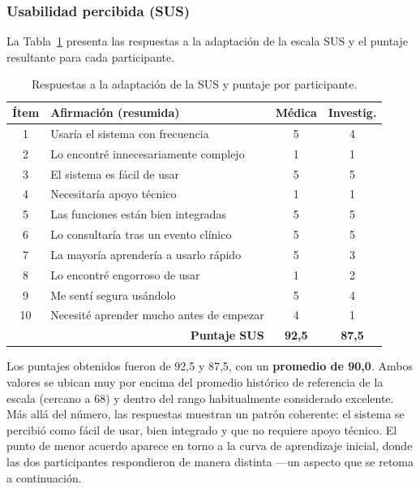 \documentclass[12pt,a4paper]{article}
\begin{document}
    \subsubsection{Usabilidad percibida (SUS)}
    La Tabla~\ref{tab:sus} presenta las respuestas a la adaptación de la escala SUS y el puntaje resultante para cada participante.

    \begin{table}[h]
        \centering
        \begin{tabular}{c l c c}
            \hline
            \textbf{Ítem} & \textbf{Afirmación (resumida)} & \textbf{Médica} & \textbf{Investig.} \\
            \hline
            1 & Usaría el sistema con frecuencia & 5 & 4 \\
            2 & Lo encontré innecesariamente complejo & 1 & 1 \\
            3 & El sistema es fácil de usar & 5 & 5 \\
            4 & Necesitaría apoyo técnico & 1 & 1 \\
            5 & Las funciones están bien integradas & 5 & 5 \\
            6 & Lo consultaría tras un evento clínico & 5 & 5 \\
            7 & La mayoría aprendería a usarlo rápido & 5 & 3 \\
            8 & Lo encontré engorroso de usar & 1 & 2 \\
            9 & Me sentí segura usándolo & 5 & 4 \\
            10 & Necesité aprender mucho antes de empezar & 4 & 1 \\
            \hline
            \multicolumn{2}{r}{\textbf{Puntaje SUS}} & \textbf{92,5} & \textbf{87,5} \\
            \hline
        \end{tabular}
        \caption{Respuestas a la adaptación de la SUS y puntaje por participante.}
        \label{tab:sus}
    \end{table}

    Los puntajes obtenidos fueron de 92,5 y 87,5, con un \textbf{promedio de 90,0}. Ambos valores se ubican muy por encima del promedio histórico de referencia de la escala (cercano a 68) y dentro del rango habitualmente considerado excelente. Más allá del número, las respuestas muestran un patrón coherente: el sistema se percibió como fácil de usar, bien integrado y que no requiere apoyo técnico. El punto de menor acuerdo aparece en torno a la curva de aprendizaje inicial, donde las dos participantes respondieron de manera distinta —un aspecto que se retoma a continuación.
\end{document}
